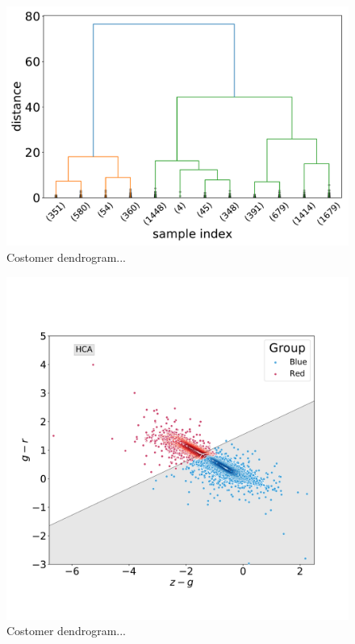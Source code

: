 \documentclass[fleqn,usenatbib]{mnras}
\begin{document}
{\begin{figure}
	\includegraphics[width=0.9\linewidth]{Figs/Customer-Dendrograms.pdf}
    \caption{Costomer dendrogram...}
    \label{fig:dendrogram}
\end{figure}

\begin{figure}
	\includegraphics[width=0.9\linewidth]{Figs/blued-red-hierarchical.pdf}
    \caption{Costomer dendrogram...}
    \label{fig:hierar}
\end{figure}

}
\end{document}
